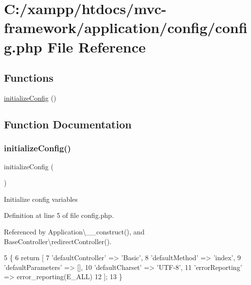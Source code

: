 \hypertarget{config_8php}{}\section{C\+:/xampp/htdocs/mvc-\/framework/application/config/config.php File Reference}
\label{config_8php}
\subsection*{Functions}
\begin{DoxyCompactItemize}
\item 
\hyperlink{config_8php_afeb1d281d402615776fdb0320a5b8d05}{initialize\+Config} ()
\end{DoxyCompactItemize}


\subsection{Function Documentation}
\hypertarget{config_8php_afeb1d281d402615776fdb0320a5b8d05}{}\label{config_8php_afeb1d281d402615776fdb0320a5b8d05} 
\subsubsection{\texorpdfstring{initialize\+Config()}{initializeConfig()}}
{\footnotesize\ttfamily initialize\+Config (\begin{DoxyParamCaption}{ }\end{DoxyParamCaption})}

Initialize config variables 

Definition at line 5 of file config.\+php.



Referenced by Application\textbackslash{}\+\_\+\+\_\+construct(), and Base\+Controller\textbackslash{}redirect\+Controller().


\begin{DoxyCode}
5                             \{
6     \textcolor{keywordflow}{return} [
7         \textcolor{stringliteral}{'defaultController'} => \textcolor{stringliteral}{'Basic'},
8         \textcolor{stringliteral}{'defaultMethod'} => \textcolor{stringliteral}{'index'},
9         \textcolor{stringliteral}{'defaultParameters'} => [],
10         \textcolor{stringliteral}{'defaultCharset'} => \textcolor{stringliteral}{'UTF-8'},
11         \textcolor{stringliteral}{'errorReporting'} => error\_reporting(E\_ALL)
12     ];
13 \}
\end{DoxyCode}
